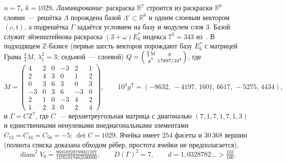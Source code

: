 \documentclass{article}
\theoremstyle{plain}
\theoremstyle{remark}
\newcommand{\R}{\mathbb{R}}
\newcommand{\Z}{\mathbb{Z}}
\newcommand{\diam}{\operatorname{diam}}
\begin{document}
{\bfseries\boldmath $n=7$, $k=1029$.} \emph{Ламинирование}: раскраска
$\R^7$ строится из раскраски $\R^6$ слоями~--- решётка $\Lambda$ порождена
базой $\Lambda'\subset\R^6$ и одним слоевым вектором $(c,t)$, а подрешётка
$\Gamma$ задаётся условием на базу и модулем слоя $3$. Базой служит
эйзенштейнова раскраска $(3+\omega)E_6^*$ индекса $7^3=343$
из~\cite{ABPR}. В подходящем $\Z$-базисе (первые шесть векторов порождают
базу $E_6^*$ с матрицей Грама $\tfrac34M$, $\lambda_1^2=3$; седьмой~---
слоевой)
$Q=\Bigl(\begin{smallmatrix}\frac34M&g\\ g^{\mathsf T}&17897/10^4\end{smallmatrix}\Bigr)$,
где
\[
M=\left(\begin{smallmatrix}
4&2&0&-3&2&1\\ 2&4&3&0&1&2\\ 0&3&6&3&0&3\\
-3&0&3&6&-3&0\\ 2&1&0&-3&4&2\\ 1&2&3&0&2&4
\end{smallmatrix}\right),\qquad
10^4g^{\mathsf T}=(-8632,\,-4197,\,1601,\,6617,\,-5275,\,4434),
\]
и $\Gamma=C\Z^7$, где $C$~--- верхнетреугольная матрица с диагональю
$(7,1,7,1,7,1,3)$ и единственными ненулевыми внедиагональными элементами
$C_{12}=C_{34}=C_{56}=-5$; $\det C=1029$. Ячейка имеет $254$ фасеты и
$30\,368$ вершин (полнота списка доказана обходом рёбер, простота ячейки не
предполагается),
\[
\diam^2V_0=\tfrac{96858928789031597}{14761819462500000},\qquad
D(\Gamma)^2=7,\qquad
d=1{,}0328782\ldots>\tfrac{103}{100}.
\]
\end{document}
